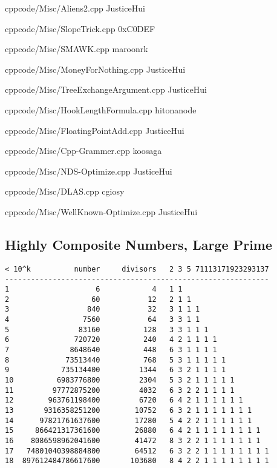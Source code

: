 \documentclass[landscape, 8pt, a4paper, oneside]{extarticle}
\begin{document}
\begin{multicols*}{3}
{}{}
{cpp}{code/Misc/Aliens2.cpp}
{JusticeHui}

{}{}
{cpp}{code/Misc/SlopeTrick.cpp}
{0xC0DEF}

{}{}
{cpp}{code/Misc/SMAWK.cpp}
{maroonrk}

{}{}
{cpp}{code/Misc/MoneyForNothing.cpp}
{JusticeHui}

{}{}
{cpp}{code/Misc/TreeExchangeArgument.cpp}
{JusticeHui}

{}{}
{cpp}{code/Misc/HookLengthFormula.cpp}
{hitonanode}

{}{}
{cpp}{code/Misc/FloatingPointAdd.cpp}
{JusticeHui}

{}{}
{cpp}{code/Misc/Cpp-Grammer.cpp}
{koosaga}

{}{}
{cpp}{code/Misc/NDS-Optimize.cpp}
{JusticeHui}

{}{}
{cpp}{code/Misc/DLAS.cpp}
{cgiosy}

{}{}
{cpp}{code/Misc/WellKnown-Optimize.cpp}
{JusticeHui}

\subsection{Highly Composite Numbers, Large Prime} %
\begin{verbatim}
< 10^k          number     divisors   2 3 5 71113171923293137
-------------------------------------------------------------
1                    6            4   1 1
2                   60           12   2 1 1
3                  840           32   3 1 1 1
4                 7560           64   3 3 1 1
5                83160          128   3 3 1 1 1
6               720720          240   4 2 1 1 1 1
7              8648640          448   6 3 1 1 1 1
8             73513440          768   5 3 1 1 1 1 1
9            735134400         1344   6 3 2 1 1 1 1
10          6983776800         2304   5 3 2 1 1 1 1 1
11         97772875200         4032   6 3 2 2 1 1 1 1
12        963761198400         6720   6 4 2 1 1 1 1 1 1
13       9316358251200        10752   6 3 2 1 1 1 1 1 1 1
14      97821761637600        17280   5 4 2 2 1 1 1 1 1 1
15     866421317361600        26880   6 4 2 1 1 1 1 1 1 1 1
16    8086598962041600        41472   8 3 2 2 1 1 1 1 1 1 1
17   74801040398884800        64512   6 3 2 2 1 1 1 1 1 1 1 1
18  897612484786617600       103680   8 4 2 2 1 1 1 1 1 1 1 1


\end{verbatim}
\end{multicols*}
\end{document}
